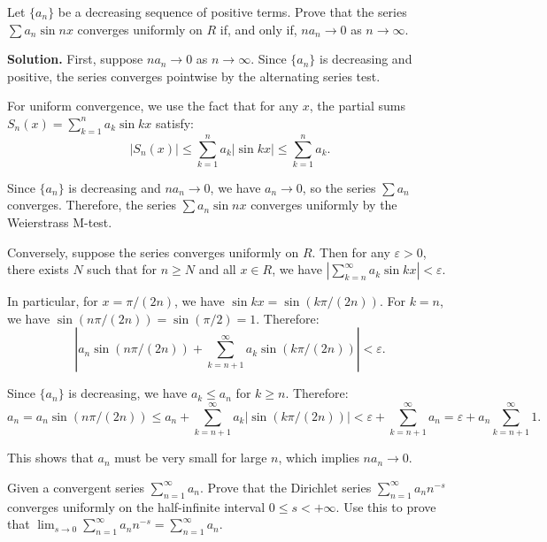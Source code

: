 \begin{problembox}
Let \(\{a_n\}\) be a decreasing sequence of positive terms. Prove that the series \(\sum a_n \sin nx \) converges uniformly on \( R \) if, and only if, \( na_n \to 0 \) as \( n \to \infty \).
\end{problembox}

\noindent\textbf{Solution.} First, suppose \( na_n \to 0 \) as \( n \to \infty \). Since \( \{a_n\} \) is decreasing and positive, the series converges pointwise by the alternating series test.

For uniform convergence, we use the fact that for any \( x \), the partial sums \( S_n(x) = \sum_{k=1}^n a_k \sin kx \) satisfy:
\[|S_n(x)| \leq \sum_{k=1}^n a_k |\sin kx| \leq \sum_{k=1}^n a_k.\]

Since \( \{a_n\} \) is decreasing and \( na_n \to 0 \), we have \( a_n \to 0 \), so the series \( \sum a_n \) converges. Therefore, the series \( \sum a_n \sin nx \) converges uniformly by the Weierstrass M-test.

Conversely, suppose the series converges uniformly on \( R \). Then for any \( \varepsilon > 0 \), there exists \( N \) such that for \( n \geq N \) and all \( x \in R \), we have \( |\sum_{k=n}^{\infty} a_k \sin kx| < \varepsilon \).

In particular, for \( x = \pi/(2n) \), we have \( \sin kx = \sin(k\pi/(2n)) \). For \( k = n \), we have \( \sin(n\pi/(2n)) = \sin(\pi/2) = 1 \). Therefore:
\[|a_n \sin(n\pi/(2n)) + \sum_{k=n+1}^{\infty} a_k \sin(k\pi/(2n))| < \varepsilon.\]

Since \( \{a_n\} \) is decreasing, we have \( a_k \leq a_n \) for \( k \geq n \). Therefore:
\[a_n = a_n \sin(n\pi/(2n)) \leq a_n + \sum_{k=n+1}^{\infty} a_k |\sin(k\pi/(2n))| < \varepsilon + \sum_{k=n+1}^{\infty} a_n = \varepsilon + a_n \sum_{k=n+1}^{\infty} 1.\]

This shows that \( a_n \) must be very small for large \( n \), which implies \( na_n \to 0 \).

\begin{problembox}
Given a convergent series \(\sum_{n=1}^{\infty} a_n \). Prove that the Dirichlet series \(\sum_{n=1}^{\infty} a_n n^{-s}\) converges uniformly on the half-infinite interval \( 0 \leq s < +\infty \). Use this to prove that \(\lim_{s \to 0} \sum_{n=1}^{\infty} a_n n^{-s} = \sum_{n=1}^{\infty} a_n\).
\end{problembox}

